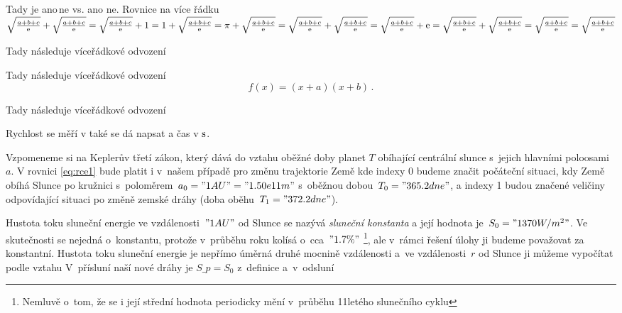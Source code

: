 \documentclass[twoside,fykos]{fksserie}
\begin{document}
\maketitle

%

\problemsheading %


\solutionheading %
Tady je ano\,ne vs. ano ne. Rovnice {na více} řádku
$
\sqrt{\frac{a+b+c}{\mathrm{e}}} + \sqrt{\frac{a+b+c}{\mathrm{e}}} =
\sqrt{\frac{a+b+c}{\mathrm{e}}} + 1 =
1 + \sqrt{\frac{a+b+c}{\mathrm{e}}} =
\pi + \sqrt{\frac{a+b+c}{\mathrm{e}}} =
\sqrt{\frac{a+b+c}{\mathrm{e}}} + \sqrt{\frac{a+b+c}{\mathrm{e}}} =
\sqrt{\frac{a+b+c}{\mathrm{e}}} + \mathrm{e} =
\sqrt{\frac{a+b+c}{\mathrm{e}}} + \sqrt{\frac{a+b+c}{\mathrm{e}}} =
\sqrt{\frac{a+b+c}{\mathrm{e}}} = \sqrt{\frac{a+b+c}{\mathrm{e}}}
$

Tady následuje víceřádkové odvození

Tady následuje víceřádkové odvození
\[
 f(x) = (x+a)(x+b)\,. \label{eq:rce2}
\]

Tady následuje víceřádkové odvození

Rychlost se měří v  také se dá napsat  a čas v $\jd{s}$.





Vzpomeneme si na Keplerův třetí zákon, který dává do vztahu oběžné 
doby planet $T$ obíhající centrální slunce s~jejich hlavními 
poloosami $a$. V rovnici \eqref{eq:rce1} bude platit i v~našem případě pro změnu
trajektorie Země
kde indexy 0 budeme značit počáteční situaci, kdy Země obíhá Slunce
po kružnici s~poloměrem~$a_0 = "1 AU" = "1.50e11 m"$ s~oběžnou dobou~$T_0 =
"365.2 dne"$,
a indexy 1 budou značené veličiny odpovídající 
situaci po změně zemské dráhy (doba oběhu~$T_1 = "372.2 dne"$).


Hustota toku sluneční energie ve vzdálenosti~$"1 AU"$ od Slunce se
nazývá {\it sluneční konstanta} a její hodnota je~$S_0 = "1370 W/m^2"$. Ve 
skutečnosti se nejedná o~konstantu, protože v~průběhu roku kolísá
o~cca~$"1.7 \%"$%
\footnote{Nemluvě o~tom, že se i její střední hodnota 
periodicky mění v~průběhu 11letého slunečního cyklu},
ale v~rámci řešení úlohy
ji budeme považovat za konstantní. Hustota toku sluneční energie je 
nepřímo úměrná druhé mocnině vzdálenosti a~ve vzdálenosti~$r$ od 
Slunce ji můžeme vypočítat podle vztahu
V~přísluní naší nové dráhy je $S\_p = S_0$ z~definice a~v~odsluní
\end{document}
